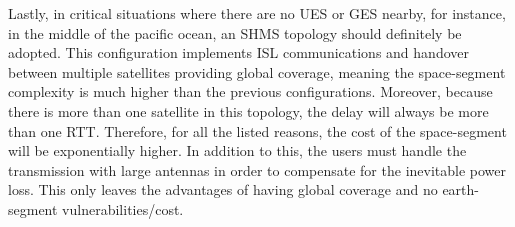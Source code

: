 Lastly, in critical situations where there are no UES or GES nearby, for instance, in the middle of the pacific ocean, an SHMS topology should definitely be adopted. This configuration implements ISL communications and handover between multiple satellites providing global coverage, meaning the space-segment complexity is much higher than the previous configurations. Moreover, because there is more than one satellite in this topology, the delay will always be more than one RTT. Therefore, for all the listed reasons, the cost of the space-segment will be exponentially higher. In addition to this, the users must handle the transmission with large antennas in order to compensate for the inevitable power loss. This only leaves the advantages of having global coverage and no earth-segment vulnerabilities/cost.